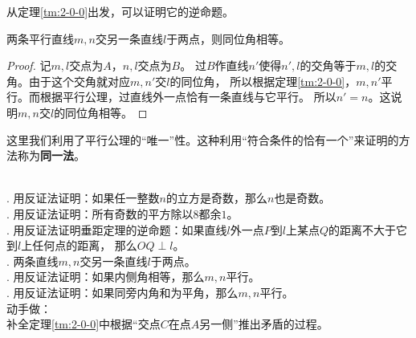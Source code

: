 \documentclass[12pt,UTF8]{ctexbook}
\begin{document}
从定理\ref{tm:2-0-0}出发，可以证明它的逆命题。

\begin{tm}\label{tm:2-0-10}
    两条平行直线$m,n$交另一条直线$l$于两点，则同位角相等。
\end{tm}

\begin{proof}
    记$m,l$交点为$A$，$n,l$交点为$B$。
    过$B$作直线$n'$使得$n',l$的交角等于$m,l$的交角。由于这个交角就对应$m,n'$交$l$的同位角，
    所以根据定理\ref{tm:2-0-0}，$m,n'$平行。而根据平行公理，过直线外一点恰有一条直线与它平行。
    所以$n' = n$。这说明$m,n$交$l$的同位角相等。
\end{proof}

这里我们利用了平行公理的“唯一”性。这种利用“符合条件的恰有一个”来证明的方法称为\textbf{同一法}。

\begin{xt}
    \mbox{} \\
    . 用反证法证明：如果任一整数$n$的立方是奇数，那么$n$也是奇数。\\
    . 用反证法证明：所有奇数的平方除以$8$都余$1$。\\
    . 用反证法证明垂距定理的逆命题：如果直线$l$外一点$P$到$l$上某点$Q$的距离不大于它到$l$上任何点的距离，
    那么$OQ \perp l$。\\
    . 两条直线$m,n$交另一条直线$l$于两点。\\
    . 用反证法证明：如果内侧角相等，那么$m,n$平行。\\
    . 用反证法证明：如果同旁内角和为平角，那么$m,n$平行。\\
    动手做：\\
    \indent 补全定理\ref{tm:2-0-0}中根据“交点$C$在点$A$另一侧”推出矛盾的过程。
\end{xt}
\end{document}
